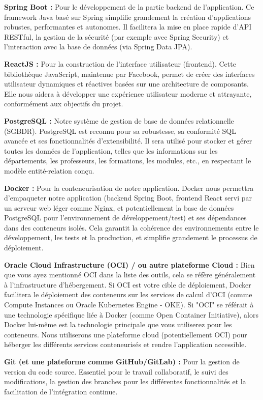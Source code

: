 
\item \textbf{Spring Boot :} Pour le développement de la partie backend de l'application. Ce framework Java basé sur Spring simplifie grandement la création d'applications robustes, performantes et autonomes. Il facilitera la mise en place rapide d'API RESTful, la gestion de la sécurité (par exemple avec Spring Security) et l'interaction avec la base de données (via Spring Data JPA).

\item \textbf{ReactJS :} Pour la construction de l'interface utilisateur (frontend). Cette bibliothèque JavaScript, maintenue par Facebook, permet de créer des interfaces utilisateur dynamiques et réactives basées sur une architecture de composants. Elle nous aidera à développer une expérience utilisateur moderne et attrayante, conformément aux objectifs du projet.

\item \textbf{PostgreSQL :} Notre système de gestion de base de données relationnelle (SGBDR). PostgreSQL est reconnu pour sa robustesse, sa conformité SQL avancée et ses fonctionnalités d'extensibilité. Il sera utilisé pour stocker et gérer toutes les données de l'application, telles que les informations sur les départements, les professeurs, les formations, les modules, etc., en respectant le modèle entité-relation conçu.

\item \textbf{Docker :} Pour la conteneurisation de notre application. Docker nous permettra d'empaqueter notre application (backend Spring Boot, frontend React servi par un serveur web léger comme Nginx, et potentiellement la base de données PostgreSQL pour l'environnement de développement/test) et ses dépendances dans des conteneurs isolés. Cela garantit la cohérence des environnements entre le développement, les tests et la production, et simplifie grandement le processus de déploiement.

\item \textbf{Oracle Cloud Infrastructure (OCI) / ou autre plateforme Cloud :} Bien que vous ayez mentionné OCI dans la liste des outils, cela se réfère généralement à l'infrastructure d'hébergement. Si OCI est votre cible de déploiement, Docker facilitera le déploiement des conteneurs sur les services de calcul d'OCI (comme Compute Instances ou Oracle Kubernetes Engine - OKE). Si "OCI" se référait à une technologie spécifique liée à Docker (comme Open Container Initiative), alors Docker lui-même est la technologie principale que vous utiliserez pour les conteneurs. Nous utiliserons une plateforme cloud (potentiellement OCI) pour héberger les différents services conteneurisés et rendre l'application accessible.

\item \textbf{Git (et une plateforme comme GitHub/GitLab) :} Pour la gestion de version du code source. Essentiel pour le travail collaboratif, le suivi des modifications, la gestion des branches pour les différentes fonctionnalités et la facilitation de l'intégration continue.
